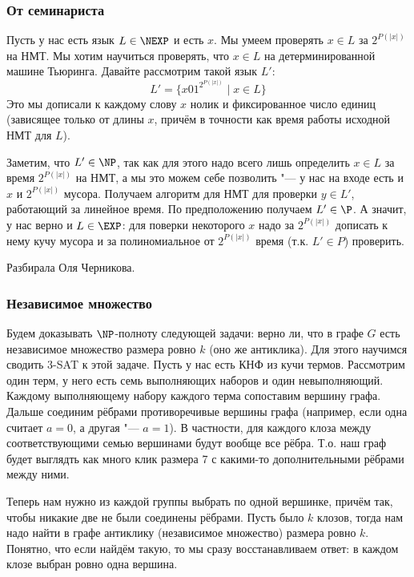 	\subsubsection{От семинариста}\label{prob13_sol2}
		Пусть у нас есть язык $L \in \NEXP$ и есть $x$.
		Мы умеем проверять $x \in L$ за $2^{P(|x|)}$ на НМТ.
		Мы хотим научиться проверять, что $x\in L$ на детерминированной машине Тьюринга.
		Давайте рассмотрим такой язык $L'$:
		\[ L' = \{ x 0 1^{2^{P(|x|)}} \mid x \in L \} \]
		Это мы дописали к каждому слову $x$ нолик и фиксированное число единиц (зависящее только от длины $x$,
		причём в точности как время работы исходной НМТ для $L$).

		Заметим, что $L' \in \NP$, так как для этого надо всего лишь определить
		$x \in L$ за время $2^{P(|x|)}$ на НМТ, а мы это можем себе позволить "--- у нас на входе
		есть и $x$ и $2^{P(|x|)}$ мусора.
		Получаем алгоритм для НМТ для проверки $y \in L'$, работающий за линейное время.
		По предположению получаем $L' \in \P$.
		А значит, у нас верно и $L \in \EXP$: для поверки некоторого $x$ надо за $2^{P(|x|)}$ дописать
		к нему кучу мусора и за полиномиальное от $2^{P(|x|)}$ время (т.к. $L' \in P$) проверить.

	Разбирала Оля Черникова.

	\subsubsection{Независимое множество}
		Будем доказывать $\NP$-полноту следующей задачи: верно ли, что в графе $G$ есть независимое множество размера ровно $k$ (оно же антиклика).
		Для этого научимся сводить 3-SAT к этой задаче.
		Пусть у нас есть КНФ из кучи термов.
		Рассмотрим один терм, у него есть семь выполняющих наборов и один невыполняющий.
		Каждому выполняющему набору каждого терма сопоставим вершину графа.
		Дальше соединим рёбрами противоречивые вершины графа (например, если одна считает $a=0$, а другая "--- $a=1$).
		В частности, для каждого клоза между соответствующими семью вершинами будут вообще все рёбра.
		Т.о. наш граф будет выглядть как много клик размера 7 с какими-то дополнительными рёбрами между ними.

		Теперь нам нужно из каждой группы выбрать по одной вершинке, причём так, чтобы никакие две не были соединены рёбрами.
		Пусть было $k$ клозов, тогда нам надо найти в графе антиклику (независимое множество) размера ровно $k$.
		Понятно, что если найдём такую, то мы сразу восстанавливаем ответ: в каждом клозе выбран ровно одна вершина.


